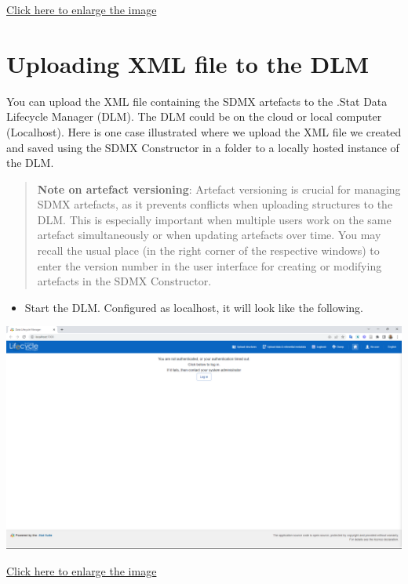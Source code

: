 \documentclass[
]{book}
\providecommand{\tightlist}{%
  \setlength{\itemsep}{0pt}\setlength{\parskip}{0pt}}
\begin{document}
\href{images/image186.png}{Click here to enlarge the image}

\hypertarget{uploading-xml}{%
\section{Uploading XML file to the DLM}\label{uploading-xml}}

You can upload the XML file containing the SDMX artefacts to the .Stat Data Lifecycle Manager (DLM). The DLM could be on the cloud or local computer (Localhost). Here is one case illustrated where we upload the XML file we created and saved using the SDMX Constructor in a folder to a locally hosted instance of the DLM.

\begin{quote}
\textbf{Note on artefact versioning}: Artefact versioning is crucial for managing SDMX artefacts, as it prevents conflicts when uploading structures to the DLM. This is especially important when multiple users work on the same artefact simultaneously or when updating artefacts over time. You may recall the usual place (in the right corner of the respective windows) to enter the version number in the user interface for creating or modifying artefacts in the SDMX Constructor.
\end{quote}

\begin{itemize}
\tightlist
\item
  Start the DLM. Configured as localhost, it will look like the following.
\end{itemize}

\begin{center}\includegraphics[width=1\linewidth]{./images/image188} \end{center}

\href{images/image188.png}{Click here to enlarge the image}
\end{document}
